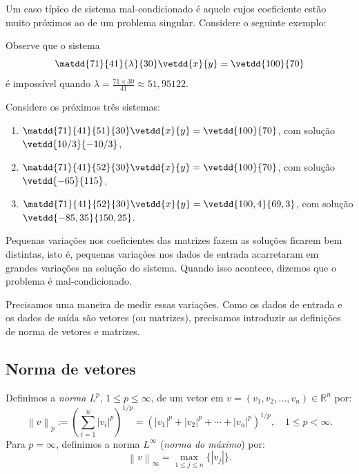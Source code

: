 Um caso típico de sistema mal-condicionado é aquele cujos coeficiente estão muito próximos ao de um problema singular. Considere o seguinte exemplo:

\begin{ex}\label{ex:sist-mal-cond} Observe que o sistema
\begin{equation}
\matdd{71}{41}{\lambda}{30}\vetdd{x}{y}=\vetdd{100}{70}
\end{equation}
é impossível quando $\lambda= \frac{71\times 30}{41}\approx 51,95122$.

Considere os próximos três sistemas:
\begin{enumerate}
 \item [a)] $\matdd{71}{41}{51}{30}\vetdd{x}{y}=\vetdd{100}{70}$, com solução $\vetdd{10/3}{-10/3}$,
 \item [b)] $\matdd{71}{41}{52}{30}\vetdd{x}{y}=\vetdd{100}{70}$, com solução $\vetdd{-65}{115}$,
 \item [c)] $\matdd{71}{41}{52}{30}\vetdd{x}{y}=\vetdd{100,4}{69,3}$, com solução $\vetdd{-85,35}{150,25}$.
\end{enumerate}

Pequenas variações nos coeficientes das matrizes fazem as soluções ficarem bem distintas, isto é, pequenas variações nos dados de entrada acarretaram em grandes variações na solução do sistema. Quando isso acontece, dizemos que o problema é mal-condicionado.
\end{ex}

Precisamos uma maneira de medir essas variações. Como os dados de entrada e os dados de saída são vetores (ou matrizes), precisamos introduzir as definições de norma de vetores e matrizes.

\subsection{Norma de vetores}

Definimos a \emph{norma $L^p$}, $1 \leq p \leq \infty$, de um vetor em $v = (v_1, v_2, \ldots, v_n)\in \mathbb{R}^n$ por:
\begin{equation}
  \left\|v\right\|_p := \left(\sum_{i=1}^n \left |v_i\right |^p\right)^{1/p} = \left(\left |v_1\right |^p+\left |v_2\right |^p+ \cdots +\left |v_n\right |^p\right)^{1/p},\quad 1\leq p < \infty.
\end{equation}
Para $p=\infty$, definimos a norma $L^{\infty}$ (\emph{norma do máximo}) por:
\begin{equation}
  \left\|v\right\|_\infty = \max_{1\leq j\leq n} \{\left |v_j\right |\}.
\end{equation}

